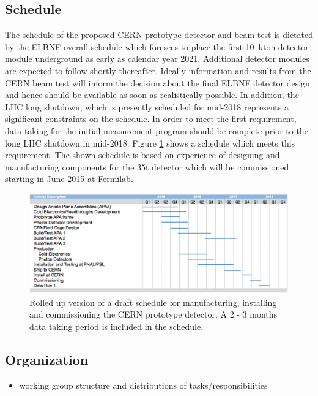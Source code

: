 
\subsection{Schedule}
The schedule of the proposed CERN prototype detector and beam test is dictated by the ELBNF overall schedule which foresees to place the first 10~kton detector module 
underground as early as calendar year 2021. Additional detector modules are expected to follow shortly thereafter.
Ideally information and results from the CERN beam test will inform the decision about the final ELBNF detector design and hence should be available as soon as 
realistically possible. In addition, the LHC long shutdown, which is presently scheduled for mid-2018 represents a significant constraints on the schedule.
In order to meet the first requirement, data taking for the initial measurement program should be complete prior to  the long LHC shutdown in mid-2018. 
Figure \ref{fig:schedule} shows a schedule which meets this requirement.
The shown schedule is based on experience of designing and manufacturing components for the 35t detector which will be commissioned starting in June 2015 at  
Fermilab.
\begin{figure}[h]
  \centering
\includegraphics[scale=0.34]{figures/150219_schedule_3APAmod.png}
  \caption{Rolled up version of a draft schedule for manufacturing, installing and commissioning the CERN prototype detector. A 2 - 3 months data taking period is included in the schedule. }
  \label{fig:schedule}
\end{figure}


\subsection{Organization}

\begin{itemize}

\item working group structure and distributions of tasks/responsibilities

\end{itemize}



